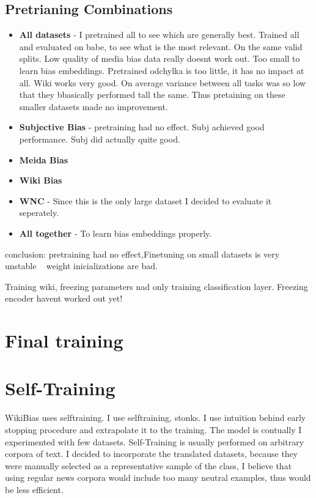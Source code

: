  
 
 
 
 \subsection{Pretrianing Combinations}
 \begin{itemize}
     \item \textbf{All datasets} -  I pretrained all to see which are generally best. Trained all and evaluated on babe, to see what is the most relevant. On the same valid splits. Low quality of media bias data really doesnt work out. Too small to learn bias embeddings.
     Pretrained odchylka is too little, it has no impact at all. Wiki works very good.
     On average variance between all tasks was so low that they bbasically performed tall the same. Thus pretaining on these smaller datasets made no improvement.
     \item \textbf{Subjective Bias} - pretraining had no effect. Subj achieved good performance. Subj did actually quite good.
     \item \textbf{Meida Bias}
     \item \textbf{Wiki Bias} 
     \item \textbf{WNC} - Since this is the only large dataset I decided to evaluate it seperately.
     \item \textbf{All together} - To learn bias embeddings properly.
 \end{itemize}
 
 conclusion: pretraining had no effect,Finetuning on small datasets is very unstable ~ weight inicializations are bad.
 
 Training wiki, freezing parameters nad only training classification layer.
 Freezing encoder havent worked out yet!
 
 
\section{Final training}
 
\section{Self-Training}
WikiBias uses selftraining. I use selftraining, stonks.
I use intuition behind early stopping procedure and extrapolate it to the training. The model is contually 
I experimented with few datasets. Self-Training is usually performed on arbitrary corpora of text. I decided to incorporate the translated datasets, because they were manually selected as a representative sample of the class, I believe that using regular news corpora would include too many neutral examples, thus would be less efficient.



